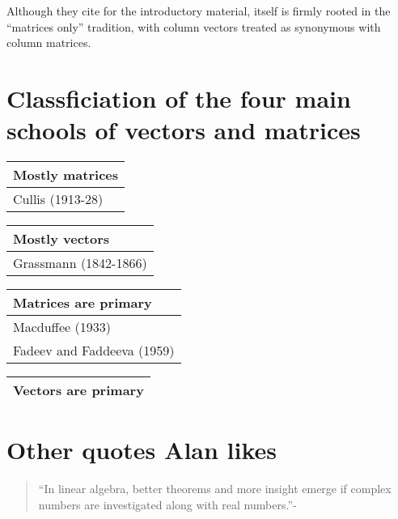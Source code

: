 Although they cite \cite{Faddeev1959} for the introductory material, \cite{Faddeev1959} itself is firmly rooted in the ``matrices only'' tradition, with column vectors treated as synonymous with column matrices.



\section{Classficiation of the four main schools of vectors and matrices}

\begin{tabular}{l}
Mostly matrices \\
\hline
Cullis (1913-28) \\
\end{tabular}

\begin{tabular}{l}
Mostly vectors \\
\hline
Grassmann (1842-1866) \\
\end{tabular}

\begin{tabular}{l}
Matrices are primary \\
\hline
Macduffee (1933) \\
Fadeev and Faddeeva (1959) \\
\end{tabular}


\begin{tabular}{l}
Vectors are primary \\
\hline
\end{tabular}

\section{Other quotes Alan likes}

\begin{quote}
``In linear algebra, better theorems and more insight emerge if complex numbers are investigated along with real numbers.''-\cite[p. 1]{Axler2015}
\end{quote}
